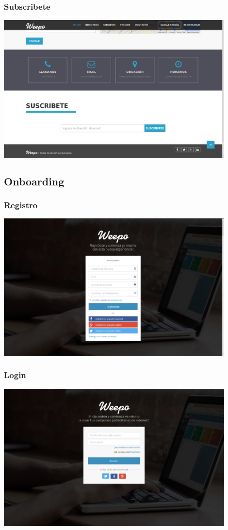 \documentclass[oneside]{book}
\begin{document}
\subsubsection{Subscribete}
\medskip
\includegraphics[width=0.9\textwidth]{images/suscripcion.png}
\bigskip


\subsection{Onboarding}
\bigskip

\subsubsection{Registro}
\medskip
\includegraphics[width=0.9\textwidth]{images/registro.png}
\bigskip

\subsubsection{Login}
\medskip
\includegraphics[width=0.9\textwidth]{images/login.png}
\bigskip
\end{document}
